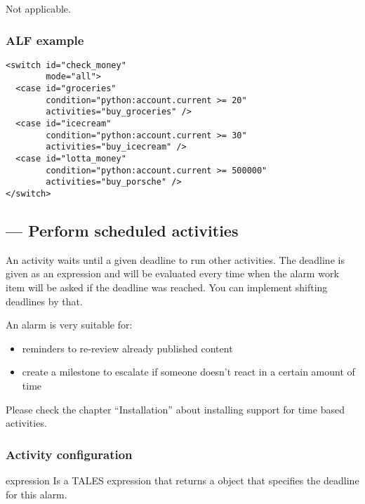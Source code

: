 Not applicable.

\subsubsection{ALF example}

\begin{verbatim}
<switch id="check_money"
        mode="all">
  <case id="groceries"
        condition="python:account.current >= 20"
        activities="buy_groceries" />
  <case id="icecream"
        condition="python:account.current >= 30"
        activities="buy_icecream" />
  <case id="lotta_money"
        condition="python:account.current >= 500000"
        activities="buy_porsche" />
</switch>
\end{verbatim}

\subsection{ --- Perform scheduled activities}
 
An  activity waits until a given deadline to run other
activities. The deadline is given as an expression and will be evaluated every
time when the alarm work item will be asked if the deadline was reached. You
can implement shifting deadlines by that.

An alarm is very suitable for:

\begin{itemize}
    \item reminders to re-review already published content
    \item create a milestone to escalate if someone doesn't react in a certain amount of time
\end{itemize}

\begin{notice} Please check the chapter ``Installation'' about installing support
 for time based activities.
\end{notice}
  
\subsubsection{Activity configuration}

\begin{memberdesc}{expression}
    Is a TALES expression that returns a  object that specifies the
    deadline for this alarm.

\end{memberdesc}

